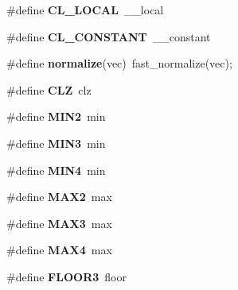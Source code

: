 \begin{DoxyCompactItemize}
\item 
\#define {\bfseries C\+L\+\_\+\+L\+O\+C\+AL}~\+\_\+\+\_\+local\hypertarget{group__g15_ga0021bb689c7920d6fd3c9ed5d08608bb}{}\label{group__g15_ga0021bb689c7920d6fd3c9ed5d08608bb}

\item 
\#define {\bfseries C\+L\+\_\+\+C\+O\+N\+S\+T\+A\+NT}~\+\_\+\+\_\+constant\hypertarget{group__g15_ga14d69037684099a5c5ea11297beede06}{}\label{group__g15_ga14d69037684099a5c5ea11297beede06}

\item 
\#define {\bfseries normalize}(vec)~fast\+\_\+normalize(vec);\hypertarget{group__g15_ga88c175e680a4573d6029bd0a04ee48a6}{}\label{group__g15_ga88c175e680a4573d6029bd0a04ee48a6}

\item 
\#define {\bfseries C\+LZ}~clz\hypertarget{group__g15_gac7d8a1461294da5b531b2e7e490f260c}{}\label{group__g15_gac7d8a1461294da5b531b2e7e490f260c}

\item 
\#define {\bfseries M\+I\+N2}~min\hypertarget{group__g15_ga393053491edc087c17e89d597b6e16f5}{}\label{group__g15_ga393053491edc087c17e89d597b6e16f5}

\item 
\#define {\bfseries M\+I\+N3}~min\hypertarget{group__g15_ga6b180e3906c3f1d430106d261bb89139}{}\label{group__g15_ga6b180e3906c3f1d430106d261bb89139}

\item 
\#define {\bfseries M\+I\+N4}~min\hypertarget{group__g15_gad8abb5481a42f4bd9b45f51720aa5b47}{}\label{group__g15_gad8abb5481a42f4bd9b45f51720aa5b47}

\item 
\#define {\bfseries M\+A\+X2}~max\hypertarget{group__g15_gaa0c19e95ba3c1d759e15a79a136ce3c6}{}\label{group__g15_gaa0c19e95ba3c1d759e15a79a136ce3c6}

\item 
\#define {\bfseries M\+A\+X3}~max\hypertarget{group__g15_gac835af96999f87c762c8ef443bb9e278}{}\label{group__g15_gac835af96999f87c762c8ef443bb9e278}

\item 
\#define {\bfseries M\+A\+X4}~max\hypertarget{group__g15_gaa3c18cd4750d26217b90145b7876b0f7}{}\label{group__g15_gaa3c18cd4750d26217b90145b7876b0f7}

\item 
\#define {\bfseries F\+L\+O\+O\+R3}~floor\hypertarget{group__g15_ga6bf2956c978872eabd4eb9ea82699055}{}\label{group__g15_ga6bf2956c978872eabd4eb9ea82699055}


\end{DoxyCompactItemize}
